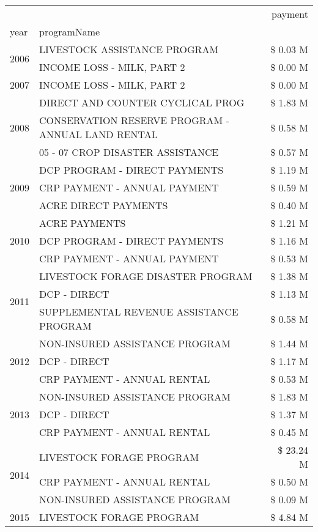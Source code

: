 \begin{tabular}{llr}
\toprule
 &  & payment \\
year & programName &  \\
\midrule
\multirow[t]{2}{*}{2006} & LIVESTOCK ASSISTANCE PROGRAM & \$ 0.03 M \\
 & INCOME LOSS - MILK, PART 2 & \$ 0.00 M \\
\cline{1-3}
2007 & INCOME LOSS - MILK, PART 2 & \$ 0.00 M \\
\cline{1-3}
\multirow[t]{3}{*}{2008} & DIRECT AND COUNTER CYCLICAL PROG & \$ 1.83 M \\
 & CONSERVATION RESERVE PROGRAM - ANNUAL LAND RENTAL & \$ 0.58 M \\
 & 05 - 07 CROP DISASTER ASSISTANCE & \$ 0.57 M \\
\cline{1-3}
\multirow[t]{3}{*}{2009} & DCP PROGRAM - DIRECT PAYMENTS & \$ 1.19 M \\
 & CRP PAYMENT - ANNUAL PAYMENT & \$ 0.59 M \\
 & ACRE DIRECT PAYMENTS & \$ 0.40 M \\
\cline{1-3}
\multirow[t]{3}{*}{2010} & ACRE PAYMENTS & \$ 1.21 M \\
 & DCP PROGRAM - DIRECT PAYMENTS & \$ 1.16 M \\
 & CRP PAYMENT - ANNUAL PAYMENT & \$ 0.53 M \\
\cline{1-3}
\multirow[t]{3}{*}{2011} & LIVESTOCK FORAGE DISASTER PROGRAM & \$ 1.38 M \\
 & DCP - DIRECT & \$ 1.13 M \\
 & SUPPLEMENTAL REVENUE ASSISTANCE PROGRAM & \$ 0.58 M \\
\cline{1-3}
\multirow[t]{3}{*}{2012} & NON-INSURED ASSISTANCE PROGRAM & \$ 1.44 M \\
 & DCP - DIRECT & \$ 1.17 M \\
 & CRP PAYMENT - ANNUAL RENTAL & \$ 0.53 M \\
\cline{1-3}
\multirow[t]{3}{*}{2013} & NON-INSURED ASSISTANCE PROGRAM & \$ 1.83 M \\
 & DCP - DIRECT & \$ 1.37 M \\
 & CRP PAYMENT - ANNUAL RENTAL & \$ 0.45 M \\
\cline{1-3}
\multirow[t]{3}{*}{2014} & LIVESTOCK FORAGE PROGRAM & \$ 23.24 M \\
 & CRP PAYMENT - ANNUAL RENTAL & \$ 0.50 M \\
 & NON-INSURED ASSISTANCE PROGRAM & \$ 0.09 M \\
\cline{1-3}
\multirow[t]{3}{*}{2015} & LIVESTOCK FORAGE PROGRAM & \$ 4.84 M \\

\end{tabular}

